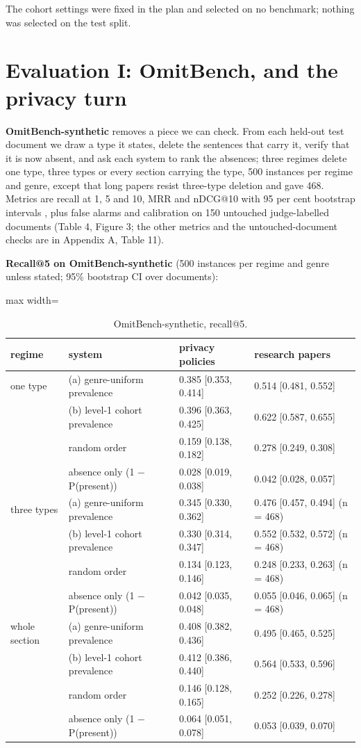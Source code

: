 \documentclass[11pt,a4paper]{article}
\newcommand{\panel}[1]{\par\medskip\noindent #1\par\smallskip}
\begin{document}
The cohort settings were fixed in the plan and selected on no benchmark; nothing was selected on the test split.

\section{Evaluation I: OmitBench, and the privacy turn}

\textbf{OmitBench-synthetic} removes a piece we can check. From each held-out test document we draw a type it states, delete the sentences that carry it, verify that it is now absent, and ask each system to rank the absences; three regimes delete one type, three types or every section carrying the type, 500 instances per regime and genre, except that long papers resist three-type deletion and gave 468.  Metrics are recall at 1, 5 and 10, MRR and nDCG@10 with 95 per cent bootstrap intervals \cite{r26}, plus false alarms and calibration on 150 untouched judge-labelled documents (Table 4, Figure 3; the other metrics and the untouched-document checks are in Appendix A, Table 11).

\begin{table}[!htbp]
\centering\small
\panel{\textbf{Recall@5 on OmitBench-synthetic} (500 instances per regime and genre unless stated; 95\% bootstrap CI over documents):}
\begin{adjustbox}{max width=\linewidth}
\begin{tabular}{llll}
\toprule
regime & system & privacy policies & research papers \\
\midrule
one type & (a) genre-uniform prevalence & 0.385 [0.353, 0.414] & 0.514 [0.481, 0.552] \\
 & (b) level-1 cohort prevalence & 0.396 [0.363, 0.425] & 0.622 [0.587, 0.655] \\
 & random order & 0.159 [0.138, 0.182] & 0.278 [0.249, 0.308] \\
 & absence only (1 $-$ P(present)) & 0.028 [0.019, 0.038] & 0.042 [0.028, 0.057] \\
three types & (a) genre-uniform prevalence & 0.345 [0.330, 0.362] & 0.476 [0.457, 0.494] (n = 468) \\
 & (b) level-1 cohort prevalence & 0.330 [0.314, 0.347] & 0.552 [0.532, 0.572] (n = 468) \\
 & random order & 0.134 [0.123, 0.146] & 0.248 [0.233, 0.263] (n = 468) \\
 & absence only (1 $-$ P(present)) & 0.042 [0.035, 0.048] & 0.055 [0.046, 0.065] (n = 468) \\
whole section & (a) genre-uniform prevalence & 0.408 [0.382, 0.436] & 0.495 [0.465, 0.525] \\
 & (b) level-1 cohort prevalence & 0.412 [0.386, 0.440] & 0.564 [0.533, 0.596] \\
 & random order & 0.146 [0.128, 0.165] & 0.252 [0.226, 0.278] \\
 & absence only (1 $-$ P(present)) & 0.064 [0.051, 0.078] & 0.053 [0.039, 0.070] \\
\bottomrule
\end{tabular}
\end{adjustbox}
\caption{OmitBench-synthetic, recall@5.}
\end{table}
\end{document}

